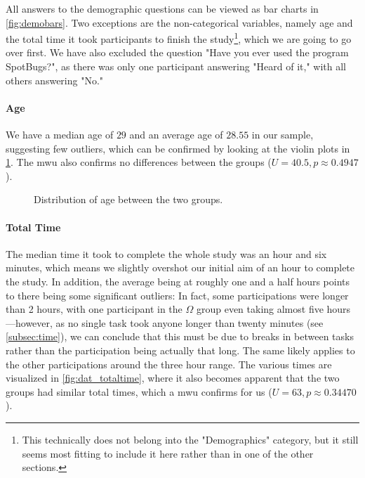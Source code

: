 \documentclass[../thesis]{subfiles}
\begin{document}
All answers to the demographic questions can be viewed as bar charts in \cref{fig:demobars}.
Two exceptions are the non-categorical variables, namely age and the total time it took participants to finish the study\footnote{This technically does not belong into the "Demographics" category, but it still seems most fitting to include it here rather than in one of the other sections.}, which we are going to go over first.
We have also excluded the question "Have you ever used the program SpotBugs?", as there was only one participant answering "Heard of it," with all others answering "No."


\paragraph{Age}
We have a median age of $29$ and an average age of $28.55$ in our sample, suggesting few outliers, which can be confirmed by looking at the violin plots in \cref{fig:dat_age}.
The \gls{mwu} also confirms no differences between the groups ($U = 40.5, p \approx 0.4947$).

\begin{figure}
	\begin{center}
	\end{center}
	\caption{Distribution of age between the two groups.}\label{fig:dat_age}
\end{figure}

\paragraph{Total Time}
The median time it took to complete the whole study was an hour and six minutes, which means we slightly overshot our initial aim of an hour to complete the study.
In addition, the average being at roughly one and a half hours points to there being some significant outliers:
In fact, some participations were longer than 2 hours, with one participant in the $\Omega$ group even taking almost five hours---however, as no single task took anyone longer than twenty minutes (see \cref{subsec:time}), we can conclude that this must be due to breaks in between tasks rather than the participation being actually that long.
The same likely applies to the other participations around the three hour range.
The various times are visualized in \cref{fig:dat_totaltime}, where it also becomes apparent that the two groups had similar total times, which a \gls{mwu} confirms for us ($U = 63, p \approx 0.34470$).
\end{document}
